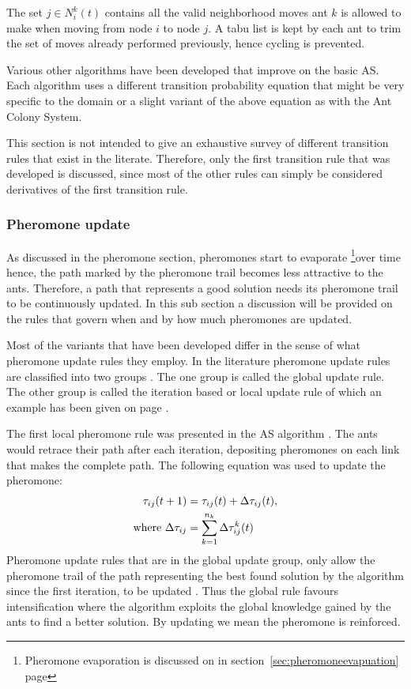 The set $j \in N^k_i(t)$ contains all the valid neighborhood moves ant $k$ is allowed to make when moving from node $i$ to node $j$. A tabu list is kept by each ant to trim the set of moves already performed previously, hence cycling is prevented.

Various other algorithms have been developed that improve on the basic AS. Each algorithm uses a different transition probability equation that might be very specific to the domain or a slight variant of the above equation as with the Ant Colony System.

This section is not intended to give an exhaustive survey of different transition rules that exist in the literate. Therefore, only the first transition rule that was developed is discussed, since most of the other rules can simply be considered derivatives of the first transition rule.
\subsubsection{Pheromone update}
As discussed in the pheromone section, pheromones start to evaporate \footnote{Pheromone evaporation is discussed on in section~\ref{sec:pheromoneevapuation} page \pageref{sec:pheromoneevapuation}}over time hence, the path marked by the pheromone trail becomes less attractive to the ants. Therefore, a path that represents a good solution needs its pheromone trail to be continuously updated. In this sub section a discussion will be provided on the rules that govern when and by how much pheromones are updated.

 Most of the variants that have been developed differ in the sense of what pheromone update rules they employ. In the literature pheromone update rules are classified into two groups \cite{CompuIntelligenceIntro}. The one group is called the global update rule. The other group is called the iteration based or local update rule of which an example has been given on page \pageref{def:localpheromoneupdate} \cite{CompuIntelligenceIntro}. 

The first local pheromone rule was presented in the AS algorithm \cite{CompuIntelligenceIntro}. The ants would retrace their path after each iteration, depositing pheromones on each link that makes the complete path. The following equation was used to update the pheromone:
\begin{align}
 \tau_{ij}(t+1) &= \tau_{ij}(t) + \Delta\tau_{ij}(t),\\ 
 \text{where }\Delta\tau_{ij} &= \sum^{n_k}_{k=1}\Delta\tau^k_{ij}(t) \notag
\end{align}
Pheromone update rules that are in the global update group, only allow the pheromone trail of the path representing the best found solution by the algorithm since the first iteration, to be updated \cite{CompuIntelligenceIntro}. Thus the global rule favours intensification where the algorithm exploits the global knowledge gained by the ants to find a better solution. By updating we mean the pheromone is reinforced. 

